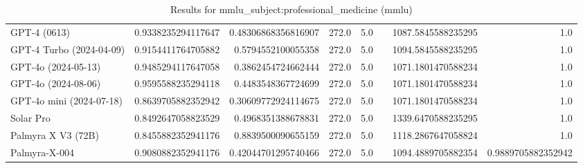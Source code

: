 \begin{table}[htp]
{\begin{tabular}{lrrrrrrr}
GPT-4 (0613) & 0.9338235294117647 & 0.48306868356816907 & 272.0 & 5.0 &  & 1087.5845588235295 & 1.0 \\
GPT-4 Turbo (2024-04-09) & 0.9154411764705882 & 0.5794552100055358 & 272.0 & 5.0 &  & 1094.5845588235295 & 1.0 \\
GPT-4o (2024-05-13) & 0.9485294117647058 & 0.3862454724662444 & 272.0 & 5.0 &  & 1071.1801470588234 & 1.0 \\
GPT-4o (2024-08-06) & 0.9595588235294118 & 0.4483548367724699 & 272.0 & 5.0 &  & 1071.1801470588234 & 1.0 \\
GPT-4o mini (2024-07-18) & 0.8639705882352942 & 0.30609772924114675 & 272.0 & 5.0 &  & 1071.1801470588234 & 1.0 \\
Solar Pro & 0.8492647058823529 & 0.4968351388678831 & 272.0 & 5.0 &  & 1339.6470588235295 & 1.0 \\
Palmyra X V3 (72B) & 0.8455882352941176 & 0.8839500090655159 & 272.0 & 5.0 &  & 1118.2867647058824 & 1.0 \\
Palmyra-X-004 & 0.9080882352941176 & 0.42044701295740466 & 272.0 & 5.0 &  & 1094.4889705882354 & 0.9889705882352942 \\
\bottomrule
\end{tabular}}
\caption{Results for mmlu_subject:professional_medicine (mmlu)}
\label{fig:mmlu_subject:professional_medicine (mmlu)}
\end{table}